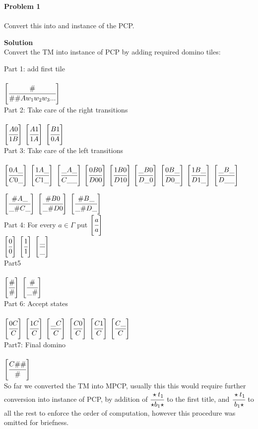 \documentclass{article}
\newcommand{\domino}[2]{\left [ \cfrac{#1}{#2} \right ]}
\newcommand{\problem}[1]{\large{\textbf{Problem #1}}\\}
\begin{document}
\problem{1} \\
Convert this into and instance of the PCP.

\textbf{Solution} \\
Convert the TM into instance of PCP by adding required domino tiles:

Part 1: add first tile\\ \\
$\domino{\#}{\#\#Aw_1w_2w_3...}$ \\

Part 2: Take care of the right transitions\\ \\
$\domino{A0}{1B}$ 
$\domino{A1}{1A}$ 
$\domino{B1}{0A}$  \\

Part 3: Take care of the left transitions\\ \\ 
$\domino{0A\_}{C0\_}$
$\domino{1A\_}{C1\_}$
$\domino{\_A\_}{C\_\_}$
$\domino{0B0}{D00}$
$\domino{1B0}{D10}$
$\domino{\_B0}{D\_0}$ 
$\domino{0B\_}{D0\_}$
$\domino{1B\_}{D1\_}$
$\domino{\_B\_}{D\_\_}$

$\domino{\#A\_}{\_\#C\_}$ 
$\domino{\#B0}{\_\#D0}$ 
$\domino{\#B\_}{\_\#D\_}$\\

Part 4: For every $a \in \Gamma$ put $\domino{a}{a}$\\
$\domino{0}{0}$ 
$\domino{1}{1}$ 
$\domino{\_}{\_}$ \\

Part5\\ \\
$\domino{\#}{\#}$
$\domino{\#}{\_\#}$ \\


Part 6: Accept states\\ \\
$\domino{0C}{C}$ 
$\domino{1C}{C}$ 
$\domino{\_C}{C}$
$\domino{C0}{C}$ 
$\domino{C1}{C}$ 
$\domino{C\_}{C}$ \\

Part7: Final domino\\ \\
$\domino{C\#\#}{\#}$ \\

So far we converted the TM into MPCP, usually this this would require further conversion into instance of PCP, by 
addition of $\cfrac{\star t_1}{\star b_1 \star} $ to the first title, and  $\cfrac{\star t_1}{b_1 \star} $ to all the 
rest to enforce the order of computation, however this procedure was omitted for briefness.
\end{document}
